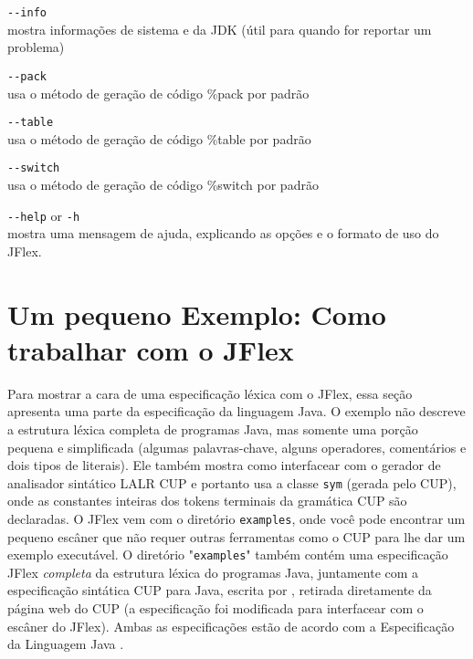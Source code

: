 \documentclass[11pt]{scrartcl}
\newcommand{\trit}{\em}
\begin{document}
\begin{description}
\item \verb+--info+\\
  mostra informa\c{c}\~oes de sistema e da JDK (\'util para quando for reportar um problema)

\item \verb+--pack+\\
  usa o m\'etodo de gera\c{c}\~ao de c\'odigo \%pack por padr\~ao

\item \verb+--table+\\
  usa o m\'etodo de gera\c{c}\~ao de c\'odigo \%table por padr\~ao

\item \verb+--switch+\\
  usa o m\'etodo de gera\c{c}\~ao de c\'odigo \%switch por padr\~ao

\item \verb+--help+ or \texttt{-h}\\
  mostra uma mensagem de ajuda, explicando as op\c{c}\~oes e o formato de uso do JFlex.
\end{description}

\section{Um pequeno Exemplo: Como trabalhar com o JFlex\label{Exemplo}}
Para mostrar a cara de uma especifica\c{c}\~ao l\'exica com o JFlex, essa se\c{c}\~ao
apresenta uma parte da especifica\c{c}\~ao da linguagem Java.
O exemplo n\~ao descreve a estrutura l\'exica completa de programas Java,
mas somente uma por\c{c}\~ao pequena e simplificada (algumas palavras-chave, alguns operadores,
coment\'arios e dois tipos de literais). Ele tamb\'em mostra como interfacear
com o gerador de analisador sint\'atico LALR CUP \cite{CUP} e portanto
usa a classe \texttt{sym} (gerada pelo CUP), onde as constantes inteiras dos
tokens terminais da gram\'atica CUP s\~ao declaradas. O JFlex vem com o diret\'orio
\texttt{examples}, onde voc\^e pode encontrar um pequeno esc\^aner que n\~ao requer outras ferramentas
como o CUP para lhe dar um exemplo execut\'avel.
O diret\'orio "\texttt{examples}" tamb\'em cont\'em uma especifica\c{c}\~ao JFlex {\trit completa}
da estrutura l\'exica do programas Java, juntamente com a especifica\c{c}\~ao sint\'atica CUP para
Java, escrita por , retirada
diretamente da p\'agina web do CUP \cite{CUP} (a especifica\c{c}\~ao foi modificada para interfacear com o esc\^aner do JFlex). 
Ambas as especifica\c{c}\~oes est\~ao de acordo com a Especifica\c{c}\~ao da Linguagem Java \cite{LangSpec}.
\end{document}
